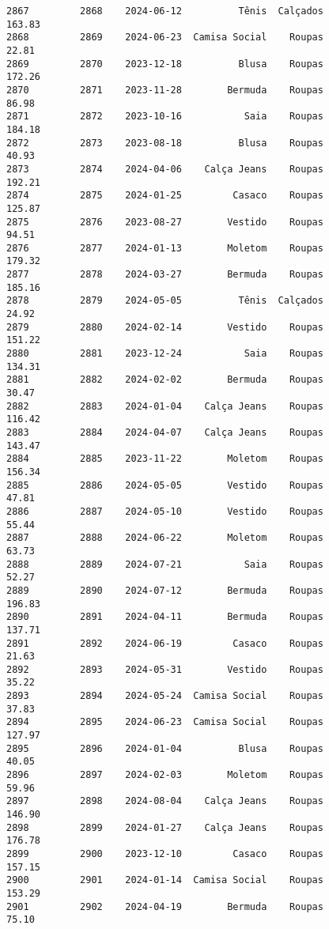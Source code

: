 \documentclass[11pt]{article}
\begin{document}
\begin{Verbatim}[commandchars=\\\{\}]
2867         2868    2024-06-12          Tênis  Calçados          163.83   
2868         2869    2024-06-23  Camisa Social    Roupas           22.81   
2869         2870    2023-12-18          Blusa    Roupas          172.26   
2870         2871    2023-11-28        Bermuda    Roupas           86.98   
2871         2872    2023-10-16           Saia    Roupas          184.18   
2872         2873    2023-08-18          Blusa    Roupas           40.93   
2873         2874    2024-04-06    Calça Jeans    Roupas          192.21   
2874         2875    2024-01-25         Casaco    Roupas          125.87   
2875         2876    2023-08-27        Vestido    Roupas           94.51   
2876         2877    2024-01-13        Moletom    Roupas          179.32   
2877         2878    2024-03-27        Bermuda    Roupas          185.16   
2878         2879    2024-05-05          Tênis  Calçados           24.92   
2879         2880    2024-02-14        Vestido    Roupas          151.22   
2880         2881    2023-12-24           Saia    Roupas          134.31   
2881         2882    2024-02-02        Bermuda    Roupas           30.47   
2882         2883    2024-01-04    Calça Jeans    Roupas          116.42   
2883         2884    2024-04-07    Calça Jeans    Roupas          143.47   
2884         2885    2023-11-22        Moletom    Roupas          156.34   
2885         2886    2024-05-05        Vestido    Roupas           47.81   
2886         2887    2024-05-10        Vestido    Roupas           55.44   
2887         2888    2024-06-22        Moletom    Roupas           63.73   
2888         2889    2024-07-21           Saia    Roupas           52.27   
2889         2890    2024-07-12        Bermuda    Roupas          196.83   
2890         2891    2024-04-11        Bermuda    Roupas          137.71   
2891         2892    2024-06-19         Casaco    Roupas           21.63   
2892         2893    2024-05-31        Vestido    Roupas           35.22   
2893         2894    2024-05-24  Camisa Social    Roupas           37.83   
2894         2895    2024-06-23  Camisa Social    Roupas          127.97   
2895         2896    2024-01-04          Blusa    Roupas           40.05   
2896         2897    2024-02-03        Moletom    Roupas           59.96   
2897         2898    2024-08-04    Calça Jeans    Roupas          146.90   
2898         2899    2024-01-27    Calça Jeans    Roupas          176.78   
2899         2900    2023-12-10         Casaco    Roupas          157.15   
2900         2901    2024-01-14  Camisa Social    Roupas          153.29   
2901         2902    2024-04-19        Bermuda    Roupas           75.10   

\end{Verbatim}
\end{document}
